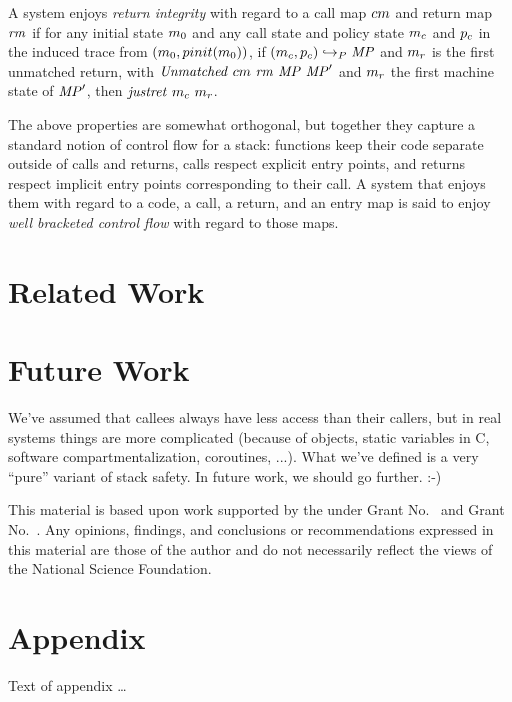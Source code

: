 \documentclass[acmsmall,review,anonymous]{acmart}\settopmatter{printfolios=true,printccs=false,printacmref=false}
\begin{document}
    A system enjoys {\em return integrity} with regard to a call map
    \(cm\) and return map \(\mathit{rm}\) if for any initial state
    \(m_0\) and any call state and policy state \(m_c\) and \(p_c\)
    in the induced trace from \((m_0,pinit(m_0))\), if
    \((m_c,p_c) \hookrightarrow_P \mathit{MP}\) and \(m_r\) is the
    first unmatched return, with \(\mathit{Unmatched}\ \callmap\ \retmap\ \MPT
    \ \MPT'\) and \(m_r\) the first machine state of \(\mathit{MP}'\),
    then \(\mathit{justret}\ m_c\ m_r\).


    The above properties are somewhat orthogonal, but together they capture a
    standard notion of control flow for a stack: functions keep their code
    separate outside of calls and returns, calls respect explicit entry points,
    and returns respect implicit entry points corresponding to their call.
    A system that enjoys them with regard to a code, a call, a return, and an
    entry map is said to enjoy {\em well bracketed control flow} with regard to
    those maps.

\section{Related Work}
\label{sec:relwork}

\section{Future Work}
\label{sec:future}

We've assumed that callees always have less access than their callers, but
in real systems things are more complicated (because of objects, static
variables in C, software compartmentalization, coroutines, ...).  What we've
defined is a very ``pure'' variant of stack safety.  In future work, we
should go further. :-)


\begin{acks}                            %
  This material is based upon work supported by the
   under Grant
  No.~ and Grant
  No.~.  Any opinions, findings, and
  conclusions or recommendations expressed in this material are those
  of the author and do not necessarily reflect the views of the
  National Science Foundation.
\end{acks}


%


\appendix
\section{Appendix}

Text of appendix \ldots
\end{document}
